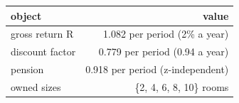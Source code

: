 \begingroup\small
\setlength{\tabcolsep}{3pt}
\renewcommand{\arraystretch}{1.04}
\begin{tabularx}{\linewidth}{Xr}
\toprule
object & value \\
\midrule
gross return R & 1.082 per period (2\% a year) \\
discount factor & 0.779 per period (0.94 a year) \\
pension & 0.918 per period (z-independent) \\
owned sizes & \{2, 4, 6, 8, 10\} rooms \\
\bottomrule
\end{tabularx}
\endgroup
